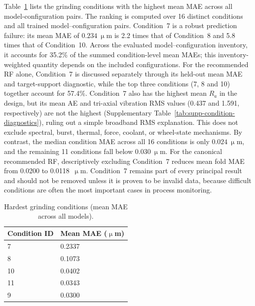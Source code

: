 Table~\ref{tbl:conditions} lists the grinding conditions with the
highest mean MAE across all model-configuration pairs. The ranking is
computed over 16 distinct conditions and all trained
model--configuration pairs. Condition~7 is a robust prediction failure:
its mean MAE of \(0.234~\upmu\)m is 2.2 times that of Condition~8 and
5.8 times that of Condition~10. Across the evaluated model--configuration
inventory, it accounts for 35.2\% of the summed condition-level mean MAEs;
this inventory-weighted quantity depends on the included configurations.
For the recommended RF alone, Condition~7 is discussed separately through
its held-out mean MAE and target-support diagnostic, while the top
three conditions (7, 8 and 10) together account for 57.4\%. Condition~7
also has the highest mean $R_a$ in the design, but its mean AE and
tri-axial vibration RMS values (0.437 and 1.591, respectively) are not
the highest (Supplementary Table~\ref{tab:supp-condition-diagnostics}),
ruling out a simple broadband RMS explanation. This does not exclude spectral, burst, thermal, force, coolant, or wheel-state mechanisms. By contrast, the median
condition MAE across all 16 conditions is only \(0.024~\upmu\)m, and
the remaining 11 conditions fall below \(0.030~\upmu\)m. For the canonical
recommended RF, descriptively excluding Condition~7 reduces mean fold MAE
from 0.0200 to 0.0118~\(\upmu\)m. Condition~7 remains part of every
principal result and should not be removed unless it
is proven to be invalid data, because difficult conditions are often the
most important cases in process monitoring.

\begin{table}[htbp]
\centering
\caption{Hardest grinding conditions (mean MAE across all
models).}\label{tbl:conditions}
\begin{tabular}[]{@{}ll@{}}
\toprule
Condition ID & Mean MAE (\(\upmu\)m) \\
\midrule
7 & 0.2337 \\
8 & 0.1073 \\
10 & 0.0402 \\
11 & 0.0343 \\
9 & 0.0300 \\
\bottomrule
\end{tabular}
\end{table}

